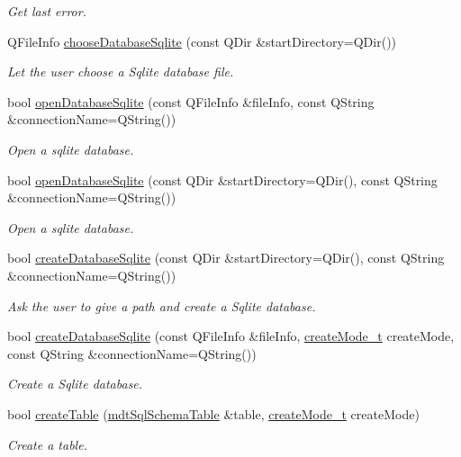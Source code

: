 \begin{DoxyCompactItemize}
\begin{DoxyCompactList}\small\item\em Get last error. \end{DoxyCompactList}\item 
QFileInfo \hyperlink{classmdt_sql_database_manager_ae6459276d25c6d3733b284249c1f1ab4}{chooseDatabaseSqlite} (const QDir \&startDirectory=QDir())
\begin{DoxyCompactList}\small\item\em Let the user choose a Sqlite database file. \end{DoxyCompactList}\item 
\hypertarget{classmdt_sql_database_manager_a336b722f66e13c5c9b09575642f7b273}{
bool \hyperlink{classmdt_sql_database_manager_a336b722f66e13c5c9b09575642f7b273}{openDatabaseSqlite} (const QFileInfo \&fileInfo, const QString \&connectionName=QString())}
\label{classmdt_sql_database_manager_a336b722f66e13c5c9b09575642f7b273}

\begin{DoxyCompactList}\small\item\em Open a sqlite database. \end{DoxyCompactList}\item 
bool \hyperlink{classmdt_sql_database_manager_a536f140060edf7721d8f0589f4d7de0d}{openDatabaseSqlite} (const QDir \&startDirectory=QDir(), const QString \&connectionName=QString())
\begin{DoxyCompactList}\small\item\em Open a sqlite database. \end{DoxyCompactList}\item 
bool \hyperlink{classmdt_sql_database_manager_ac9c9cac0342cc3a66e4c3510da8f97c9}{createDatabaseSqlite} (const QDir \&startDirectory=QDir(), const QString \&connectionName=QString())
\begin{DoxyCompactList}\small\item\em Ask the user to give a path and create a Sqlite database. \end{DoxyCompactList}\item 
bool \hyperlink{classmdt_sql_database_manager_ae2c4622505d90610d3990dd682662678}{createDatabaseSqlite} (const QFileInfo \&fileInfo, \hyperlink{classmdt_sql_database_manager_a2f5b46d67a88095053a5edfc415c7418}{createMode\_\-t} createMode, const QString \&connectionName=QString())
\begin{DoxyCompactList}\small\item\em Create a Sqlite database. \end{DoxyCompactList}\item 
bool \hyperlink{classmdt_sql_database_manager_afe78562023f6b8d530a24a9362587ed5}{createTable} (\hyperlink{classmdt_sql_schema_table}{mdtSqlSchemaTable} \&table, \hyperlink{classmdt_sql_database_manager_a2f5b46d67a88095053a5edfc415c7418}{createMode\_\-t} createMode)
\begin{DoxyCompactList}\small\item\em Create a table. \end{DoxyCompactList}\end{DoxyCompactItemize}


